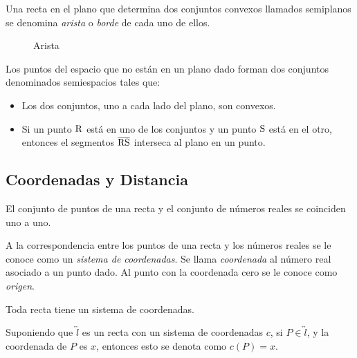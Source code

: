 \begin{definition}
    Una recta en el plano que determina dos conjuntos convexos llamados semiplanos se denomina \textit{arista} o \textit{borde} de cada uno de ellos.

    \begin{figure}[!h]
        \centering
        
        \caption{Arista}
        \label{fig:plot26}
    \end{figure}
    
\end{definition}

\begin{postulate}
    Los puntos del espacio que no están en un plano dado forman dos conjuntos denominados semiespacios tales que:

    \begin{itemize}
        \item Los dos conjuntos, uno a cada lado del plano, son convexos.
        \item Si un punto $\rm R$ está en uno de los conjuntos y un punto $\rm S$ está en el otro, entonces el segmentos $\overline{\rm RS}$ interseca al plano en un punto.
    \end{itemize}
\end{postulate}

\subsection{Coordenadas y Distancia}

\begin{postulate}
    El conjunto de puntos de una recta y el conjunto de números reales se coinciden uno a uno.
\end{postulate}

\begin{definition}
    A la correspondencia entre los puntos de una recta y los números reales se le conoce como un \textit{sistema de coordenadas}. Se llama \textit{coordenada} al número real asociado a un punto dado. Al punto con la coordenada cero se le conoce como \textit{origen}.
\end{definition}

\begin{postulate}
    Toda recta tiene un sistema de coordenadas. 
\end{postulate}

Suponiendo que $\overleftrightarrow{l}$ es un recta con un sistema de coordenadas $c$, si $P \in \overleftrightarrow{l}$, y la coordenada de $P$ es $x$, entonces esto se denota como $c(P) = x$.

